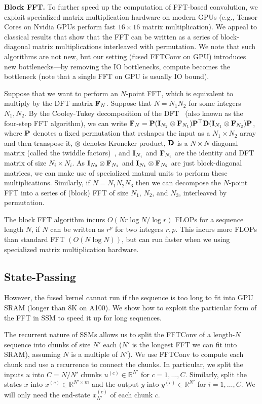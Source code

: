 \textbf{Block FFT.}
To further speed up the computation of FFT-based convolution, we exploit specialized matrix multiplication hardware on modern GPUs
(e.g., Tensor Cores on Nvidia GPUs perform fast $16 \times 16$ matrix multiplication).
We appeal to classical results that show that the FFT can be written as a series of block-diagonal matrix
multiplications interleaved with permutation.
We note that such algorithms are not new, but our setting (fused FFTConv on GPU) introduces new bottlenecks---by removing the IO bottlenecks, compute becomes the bottleneck (note that a single FFT on GPU is usually IO bound).

Suppose that we want to perform an $N$-point FFT, which is equivalent to
multiply by the DFT matrix $\mathbf{F}_N$.
Suppose that $N = N_1 N_2$ for some integers $N_1, N_2$.
By the Cooley-Tukey decomposition of the DFT~\citep{cooley1965an,
  bailey1990ffts} (also known as the four-step FFT algorithm),
we can write $\mathbf{F}_N = \mathbf{P} (\mathbf{I}_{N_2} \otimes \mathbf{F}_{N_1}) \mathbf{P}^\top \mathbf{D} (\mathbf{I}_{N_1} \otimes \mathbf{F}_{N_2}) \mathbf{P}$,
where $\mathbf{P}$ denotes a fixed permutation that reshapes the input as a $N_1 \times N_2$
array and then transpose it, $\otimes$ denotes Kroneker product, $\mathbf{D}$ is a $N \times N$
diagonal matrix (called the twiddle factors)~\citep{dao2022monarch}, and $\mathbf{I}_{N_i}$ and $\mathbf{F}_{N_i}$ are the identity and DFT matrix of size $N_i \times N_i$.
As $\mathbf{I}_{N_2} \otimes \mathbf{F}_{N_1}$ and $\mathbf{I}_{N_1} \otimes \mathbf{F}_{N_2}$ are just block-diagonal matrices,
we can make use of specialized matmul units to perform these multiplications.
Similarly, if $N = N_1 N_2 N_3$ then we can decompose the $N$-point FFT into a
series of (block) FFT of size $N_1$, $N_2$, and $N_3$, interleaved by
permutation.

The block FFT algorithm incurs $O(N r \log N / \log r)$ FLOPs for a sequence length $N$, if $N$ can be written as $r^p$ for two integers $r, p$.
This incurs more FLOPs than standard FFT $(O(N\log N))$, but can run faster when
we using specialized matrix multiplication hardware.

\subsection{State-Passing}
However, the fused kernel cannot run if the sequence is too long to fit into GPU SRAM (longer than 8K on A100).
We show how to exploit the particular form of the FFT in SSM to speed it up for long
sequences.

The recurrent nature of SSMs allows us to split the FFTConv of a length-$N$ sequence into chunks of size $N'$ each ($N'$ is the longest FFT we can fit into SRAM), assuming $N$ is a multiple of $N'$).
We use FFTConv to compute each chunk and use a recurrence to connect the chunks.
In particular, we split the inputs $u$ into $C = N/N'$ chunks $u^{(c)} \in \mathbb{R}^{N'}$ for $c=1, \dots, C$.
Similarly, split the states $x$ into $x^{(c)} \in \mathbb{R}^{N' \times m}$ and the output $y$ into $y^{(c)} \in \mathbb{R}^{N'}$ for $i = 1, \dots, C$.
We will only need the end-state $x_{N'}^{(c)}$ of each chunk $c$.

